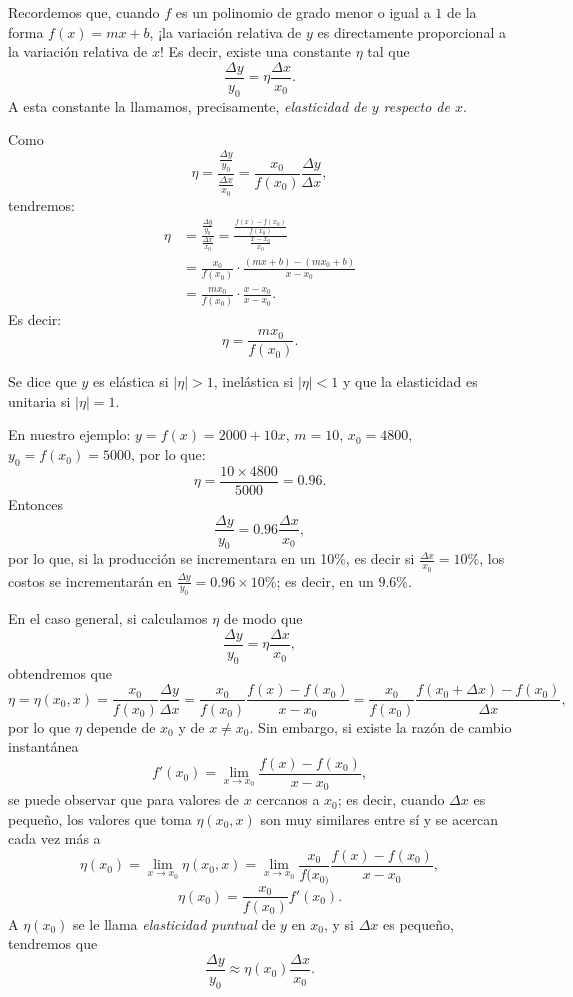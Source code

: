 Recordemos que, cuando $f$ es un polinomio de grado menor o igual a $1$ de la forma $f(x) = mx +
b$, ¡la variación relativa de $y$ es directamente proporcional a la variación relativa de $x$! Es
decir, existe una constante $\eta$ tal que
\[
\frac{\Delta y}{y_{0}} = \eta \frac{\Delta x}{x_{0}}.
\]
A esta constante la llamamos, precisamente, \emph{elasticidad de $y$ respecto de $x$}.

Como
\[
  \eta = \frac{\frac{\Delta y}{y_{0}}}{\frac{\Delta x}{x_{0}}} =
    \frac{x_{0}}{f(x_{0})}\frac{\Delta y}{\Delta x},
\]
tendremos:
\begin{align*}
\eta &= \frac{\frac{\Delta y}{y_{0}}}{\frac{\Delta x}{x_{0}}} =
  \frac{\frac{f(x) - f(x_{0})}{f(x_{0})}}{\frac{x - x_{0}}{x_{0}}} \\[4pt]
  &= \frac{x_{0}}{f(x_{0})}\cdot\frac{(mx + b)-(mx_{0}+b)}{x - x_{0}} \\[4pt]
  &= \frac{mx_{0}}{f(x_{0})}\cdot\frac{x - x_{0}}{x - x_{0}}.
\end{align*}
Es decir:
\[
\eta = \frac{mx_{0}}{f(x_{0})}.
\]

Se dice que $y$ es elástica si $|\eta|>1$, inelástica si $|\eta|<1$ y que la elasticidad es
unitaria si $|\eta| = 1$.

En nuestro ejemplo: $y = f(x) = 2000+10x$, $m = 10$, $x_{0}= 4800$, $y_{0}= f(x_{0}) = 5000$, por
lo que:
\[
\eta = \frac{10\times 4800}{5000} = 0.96.
\]
Entonces
\[
 \frac{\Delta y}{y_{0}} = 0.96\frac{\Delta x}{x_{0}},
\]
por lo que, si la producción se incrementara en un 10\%, es decir si $\frac{\Delta x}{x_{0}} =
10\%$, los costos se incrementarán en $\frac{\Delta y}{y_{0}} = 0.96\times 10\%$; es decir, en un
$9.6\%$.\vspace{\baselineskip}

En el caso general, si calculamos $\eta$ de modo que
\[
 \frac{\Delta y}{y_{0}} = \eta \frac{\Delta x}{x_{0}},
\]
obtendremos que
\[
 \eta = \eta(x_{0},x) = \frac{x_{0}}{f(x_{0})}  \frac{\Delta y}{\Delta x} =
 \frac{x_{0}}{f(x_{0})} \frac{f(x) - f(x_{0})}{x - x_{0}} =
 \frac{x_{0}}{f(x_{0})} \frac{f(x_{0} + \Delta x) - f(x_{0})}{\Delta x},
\]
por lo que $\eta$ depende de $x_{0}$ y de $x \neq x_{0}$. Sin embargo, si existe la razón de cambio
instantánea
\[
 f'(x_{0}) = \lim_{x\rightarrow x_{0}}\frac{f(x) - f(x_{0})}{x - x_{0}} ,
\]
se puede observar que para valores  de $x$ cercanos a $x_{0}$; es decir, cuando $\Delta x$ es
pequeño, los valores que toma $\eta(x_{0},x) $ son muy similares entre sí y se acercan cada vez más
a
\[
 \eta(x_{0}) = \lim_{x\rightarrow x_{0}}\eta(x_{0},x)   =
 \lim_{x\rightarrow x_{0}} \frac{x_{0}}{f(x_{0)}}  \frac{f(x) - f(x_{0})}{x - x_{0}},
\]
\[
 \eta(x_{0}) = \frac{x_{0}}{f(x_{0})} f'(x_{0}).
\]
A $\eta(x_{0}) $ se le llama \emph{elasticidad puntual} de $y$ en $x_{0}$, y si $\Delta x$ es
pequeño, tendremos que
\[
 \frac{\Delta y}{y_{0}} \approx \eta(x_{0})  \frac{\Delta x}{x_{0}}.
\]

